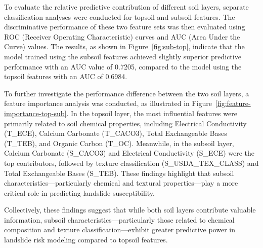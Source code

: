 To evaluate the relative predictive contribution of different soil layers, separate classification analyses were conducted for topsoil and subsoil features. The discriminative performance of these two feature sets was then evaluated using ROC (Receiver Operating Characteristic) curves and AUC (Area Under the Curve) values. The results, as shown in Figure~\ref{fig:sub-top}, indicate that the model trained using the subsoil features achieved slightly superior predictive performance with an AUC value of 0.7205, compared to the model using the topsoil features with an AUC of 0.6984.

To further investigate the performance difference between the two soil layers, a feature importance analysis was conducted, as illustrated in Figure~\ref{fig:feature-importance-top-sub}. In the topsoil layer, the most influential features were primarily related to soil chemical properties, including Electrical Conductivity (T\_ECE), Calcium Carbonate (T\_CACO3), Total Exchangeable Bases (T\_TEB), and Organic Carbon (T\_OC). Meanwhile, in the subsoil layer, Calcium Carbonate (S\_CACO3) and Electrical Conductivity (S\_ECE) were the top contributors, followed by texture classification (S\_USDA\_TEX\_CLASS) and Total Exchangeable Bases (S\_TEB). These findings highlight that subsoil characteristics—particularly chemical and textural properties—play a more critical role in predicting landslide susceptibility.

Collectively, these findings suggest that while both soil layers contribute valuable information, subsoil characteristics—particularly those related to chemical composition and texture classification—exhibit greater predictive power in landslide risk modeling compared to topsoil features.

